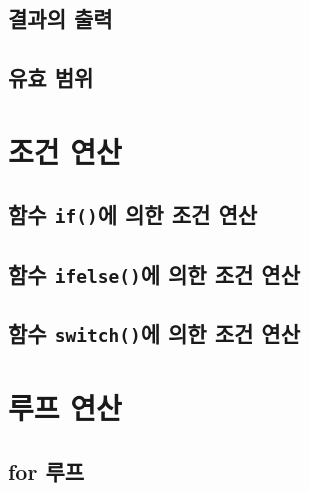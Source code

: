 \documentclass[
]{book}
\begin{document}
\hypertarget{uxacb0uxacfcuxc758-uxcd9cuxb825}{%
\subsection{결과의 출력}\label{uxacb0uxacfcuxc758-uxcd9cuxb825}}

\hypertarget{uxc720uxd6a8-uxbc94uxc704}{%
\subsection{유효 범위}\label{uxc720uxd6a8-uxbc94uxc704}}

\hypertarget{uxc870uxac74-uxc5f0uxc0b0}{%
\section{조건 연산}\label{uxc870uxac74-uxc5f0uxc0b0}}

\hypertarget{uxd568uxc218-ifuxc5d0-uxc758uxd55c-uxc870uxac74-uxc5f0uxc0b0}{%
\subsection{\texorpdfstring{함수 \texttt{if()}에 의한 조건 연산}{함수 if()에 의한 조건 연산}}\label{uxd568uxc218-ifuxc5d0-uxc758uxd55c-uxc870uxac74-uxc5f0uxc0b0}}

\hypertarget{uxd568uxc218-ifelseuxc5d0-uxc758uxd55c-uxc870uxac74-uxc5f0uxc0b0}{%
\subsection{\texorpdfstring{함수 \texttt{ifelse()}에 의한 조건 연산}{함수 ifelse()에 의한 조건 연산}}\label{uxd568uxc218-ifelseuxc5d0-uxc758uxd55c-uxc870uxac74-uxc5f0uxc0b0}}

\hypertarget{uxd568uxc218-switchuxc5d0-uxc758uxd55c-uxc870uxac74-uxc5f0uxc0b0}{%
\subsection{\texorpdfstring{함수 \texttt{switch()}에 의한 조건 연산}{함수 switch()에 의한 조건 연산}}\label{uxd568uxc218-switchuxc5d0-uxc758uxd55c-uxc870uxac74-uxc5f0uxc0b0}}

\hypertarget{uxb8e8uxd504-uxc5f0uxc0b0}{%
\section{루프 연산}\label{uxb8e8uxd504-uxc5f0uxc0b0}}

\hypertarget{for-uxb8e8uxd504}{%
\subsection{for 루프}\label{for-uxb8e8uxd504}}
\end{document}
